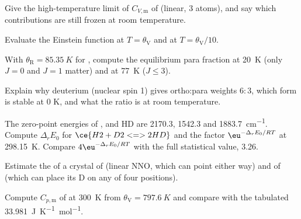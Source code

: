 \begin{exercise}[$\star$]\label{exo:b3:statistical-thermo-applied:1}
Give the high-temperature limit of $C_{V,\mathrm m}$ of  (linear, 3 atoms), and say
which contributions are still frozen at room temperature.
\end{exercise}

\begin{exercise}[$\star$]\label{exo:b3:statistical-thermo-applied:2}
Evaluate the Einstein function at $T = \theta_{\mathrm V}$ and at $T = \theta_{\mathrm V}/10$.
\end{exercise}

\begin{exercise}[$\star$]\label{exo:b3:statistical-thermo-applied:3}
With $\theta_{\mathrm R} = \qty{85.35}{K}$ for , compute the equilibrium para fraction at
\qty{20}{K} (only $J = 0$ and $J = 1$ matter) and at \qty{77}{K} ($J \le 3$).
\end{exercise}

\begin{exercise}[$\star$]\label{exo:b3:statistical-thermo-applied:4}
Explain why deuterium (nuclear spin 1) gives ortho:para weights $6 : 3$, which
form is stable at 0 K, and what the ratio is at room temperature.
\end{exercise}

\begin{exercise}[$\star\star$]\label{exo:b3:statistical-thermo-applied:5}
The zero-point energies of ,  and HD are 2170.3, 1542.3 and
\qty{1883.7}{cm^{-1}}. Compute $\Delta_rE_0$ for $\ce{H2 + D2 <=> 2 HD}$ and the factor $\eu^{-\Delta_rE_0/RT}$ at
\qty{298.15}{K}. Compare $4\eu^{-\Delta_rE_0/RT}$ with the full statistical value, 3.26.
\end{exercise}

\begin{exercise}[$\star\star$]\label{exo:b3:statistical-thermo-applied:6}
Estimate the  of a crystal of  (linear NNO, which can
point either way) and of  (which can place its D on any of four
positions).
\end{exercise}

\begin{exercise}[$\star\star$]\label{exo:b3:statistical-thermo-applied:7}
Compute $C_{p,\mathrm m}$ of  at \qty{300}{K} from $\theta_{\mathrm V} = \qty{797.6}{K}$ and compare with the
tabulated \qty{33.981}{J.K^{-1}.mol^{-1}}.
\end{exercise}

